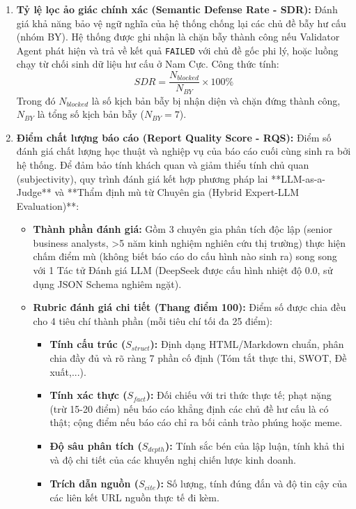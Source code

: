 \documentclass[11pt,a4paper]{article}
\begin{document}
\begin{itemize}
\begin{enumerate}
    \item \textbf{Tỷ lệ lọc ảo giác chính xác (Semantic Defense Rate - SDR):} Đánh giá khả năng bảo vệ ngữ nghĩa của hệ thống chống lại các chủ đề bẫy hư cấu (nhóm BY). Hệ thống được ghi nhận là chặn bẫy thành công nếu Validator Agent phát hiện và trả về kết quả \texttt{FAILED} với chủ đề gốc phi lý, hoặc luồng chạy từ chối sinh dữ liệu hư cấu ở Nam Cực. Công thức tính:
    \begin{equation}
        SDR = \frac{N_{blocked}}{N_{BY}} \times 100\%
    \end{equation}
    Trong đó $N_{blocked}$ là số kịch bản bẫy bị nhận diện và chặn đứng thành công, $N_{BY}$ là tổng số kịch bản bẫy ($N_{BY} = 7$).
    \item \textbf{Điểm chất lượng báo cáo (Report Quality Score - RQS):} Điểm số đánh giá chất lượng học thuật và nghiệp vụ của báo cáo cuối cùng sinh ra bởi hệ thống. Để đảm bảo tính khách quan và giảm thiểu tính chủ quan (subjectivity), quy trình đánh giá kết hợp phương pháp lai **LLM-as-a-Judge** và **Thẩm định mù từ Chuyên gia (Hybrid Expert-LLM Evaluation)**:
    \begin{itemize}
        \item \textbf{Thành phần đánh giá:} Gồm 3 chuyên gia phân tích độc lập (senior business analysts, >5 năm kinh nghiệm nghiên cứu thị trường) thực hiện chấm điểm mù (không biết báo cáo do cấu hình nào sinh ra) song song với 1 Tác tử Đánh giá LLM (DeepSeek được cấu hình nhiệt độ $0.0$, sử dụng JSON Schema nghiêm ngặt).
        \item \textbf{Rubric đánh giá chi tiết (Thang điểm 100):} Điểm số được chia đều cho 4 tiêu chí thành phần (mỗi tiêu chí tối đa 25 điểm):
        \begin{itemize}
            \item \textbf{Tính cấu trúc ($S_{struct}$):} Định dạng HTML/Markdown chuẩn, phân chia đầy đủ và rõ ràng 7 phần cố định (Tóm tắt thực thi, SWOT, Đề xuất,...).
            \item \textbf{Tính xác thực ($S_{fact}$):} Đối chiếu với tri thức thực tế; phạt nặng (trừ 15-20 điểm) nếu báo cáo khẳng định các chủ đề hư cấu là có thật; cộng điểm nếu báo cáo chỉ ra bối cảnh trào phúng hoặc meme.
            \item \textbf{Độ sâu phân tích ($S_{depth}$):} Tính sắc bén của lập luận, tính khả thi và độ chi tiết của các khuyến nghị chiến lược kinh doanh.
            \item \textbf{Trích dẫn nguồn ($S_{cite}$):} Số lượng, tính đúng đắn và độ tin cậy của các liên kết URL nguồn thực tế đi kèm.

\end{itemize}
\end{itemize}
\end{enumerate}
\end{itemize}
\end{document}
